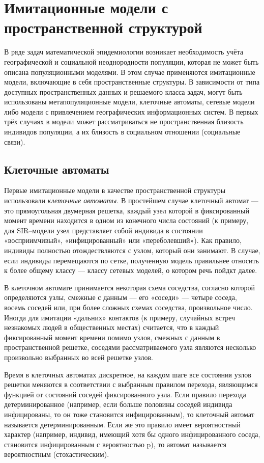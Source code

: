 \documentclass[a4paper, 14pt]{extreport}
\numberwithin{equation}{section}
\begin{document}
	\section{Имитационные модели с пространственной структурой}
	В ряде задач математической эпидемиологии
	возникает необходимость учёта географической и социальной неоднородности
	популяции, которая не может быть описана популяционными моделями. В этом
	случае применяются имитационные модели, включающие в себя
	пространственные структуры. В зависимости от типа доступных
	пространственных данных и решаемого класса задач, могут быть использованы
	метапопуляционные модели, клеточные автоматы, сетевые модели либо модели
	с привлечением географических информационных систем. В первых трёх
	случаях в модели может рассматриваться не пространственная близость
	индивидов популяции, а их близость в социальном отношении (социальные
	связи).
	
	\subsection{Клеточные автоматы}
	
	Первые имитационные модели в качестве пространственной структуры
	использовали \textit{клеточные автоматы}. В простейшем случае клеточный автомат —
	это прямоугольная двумерная решетка, каждый узел которой в фиксированный
	момент времени находится в одном из конечного числа состояний (к примеру,
	для SIR–модели узел представляет собой индивида в состоянии
	«восприимчивый», «инфицированный» или «переболевший»). Как правило,
	индивиды полностью отождествляются с узлом, который они занимают. В
	случае, если индивиды перемещаются по сетке, полученную модель правильнее
	относить к более общему классу — классу сетевых моделей, о котором речь
	пойдкт далее.
	
	В клеточном автомате принимается некоторая схема соседства, согласно
	которой определяются узлы, смежные с данным — его «соседи» — четыре
	соседа, восемь соседей или, при более сложных схемах соседства,
	произвольное число. Иногда для имитации «дальних» контактов (к примеру,
	случайных встреч незнакомых людей в общественных местах) считается, что в
	каждый фиксированный момент времени помимо узлов, смежных с данным в
	пространственной решетке, соседями рассматриваемого узла являются
	несколько произвольно выбранных во всей решетке узлов.
	
	Время в клеточных автоматах дискретное, на каждом шаге все состояния
	узлов решетки меняются в соответствии с выбранным правилом перехода,
	являющимся функцией от состояний соседей фиксированного узла. Если
	правило перехода детерминированное (например, если больше половины
	соседей индивида инфицированы, то он тоже становится инфицированным), то
	клеточный автомат называется детерминированным. Если же это правило
	имеет вероятностный характер (например, индивид, имеющий хотя бы одного инфицированного соседа, становится инфицированным с вероятностью p), то
	автомат называется вероятностным (стохастическим).
	
\end{document}
